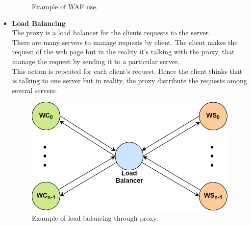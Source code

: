 \begin{itemize}
{\begin{figure}[h]
\caption{\footnotesize{Example of WAF use.}}\label{proxy_waf}
\end{figure}
}
\item{\textbf{Load Balancing}\\
The proxy is a load balancer for the clients requests to the server.\\
There are many servers to manage requests by client. The client makes the request of the web page but in the reality it's talking with the proxy, that manage the request by sending it to a particular server.\\
This action is repeated for each client's request. Hence the client thinks that is talking to one server but in reality, the proxy distribute the requests among several servers. 
\begin{figure}[h]
\centering
\includegraphics[scale=0.4]{Images/Gateway/proxy_load}
\caption{\footnotesize{Example of load balancing through proxy.}}\label{proxy_load}
\end{figure}
}
\end{itemize}